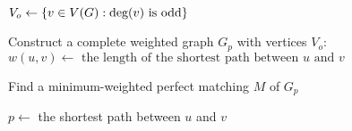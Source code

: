 
\begin{algorithm}[H]
  \begin{algorithmic}[1]
    \State $V_{o} \gets \left\{v \in V(G): \text{deg}(v) \text{ is odd}\right\}$

    \Statex
    \State Construct a complete weighted graph $G_{p}$ with vertices $V_{o}$:
      \State $w(u,v) \gets \text{ the length of the shortest path between $u$ and $v$}$ 
    \EndFor

    \Statex
    \State Find a minimum-weighted perfect matching $M$ of $G_p$

    \Statex
      \State $p \gets$ the shortest path between $u$ and $v$
      \State {}
    \EndFor
  \end{algorithmic}
\end{algorithm}
